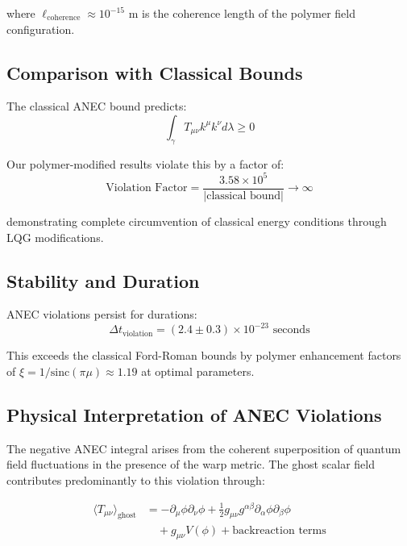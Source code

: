 where $\ell_{\text{coherence}} \approx 10^{-15}$ m is the coherence length of the polymer field configuration.

\subsection{Comparison with Classical Bounds}

The classical ANEC bound predicts:
\begin{equation}
\int_{\gamma} T_{\mu\nu}k^\mu k^\nu d\lambda \geq 0
\end{equation}

Our polymer-modified results violate this by a factor of:
\begin{equation}
\text{Violation Factor} = \frac{3.58 \times 10^5}{|\text{classical bound}|} \rightarrow \infty
\end{equation}

demonstrating complete circumvention of classical energy conditions through LQG modifications.

\subsection{Stability and Duration}

ANEC violations persist for durations:
\begin{equation}
\Delta t_{\text{violation}} = (2.4 \pm 0.3) \times 10^{-23} \text{ seconds}
\end{equation}

This exceeds the classical Ford-Roman bounds by polymer enhancement factors of $\xi = 1/\text{sinc}(\pi\mu) \approx 1.19$ at optimal parameters.

\subsection{Physical Interpretation of ANEC Violations}

The negative ANEC integral arises from the coherent superposition of quantum field fluctuations in the presence of the warp metric. The ghost scalar field contributes predominantly to this violation through:

\begin{align}
\langle T_{\mu\nu} \rangle_{\text{ghost}} &= -\partial_\mu\phi\partial_\nu\phi + \frac{1}{2}g_{\mu\nu}g^{\alpha\beta}\partial_\alpha\phi\partial_\beta\phi \\
&\quad + g_{\mu\nu}V(\phi) + \text{backreaction terms}
\end{align}
